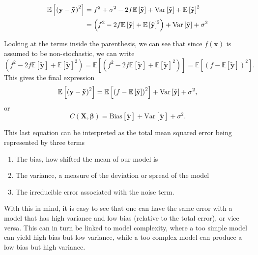 \documentclass[12pt]{article}
\begin{document}
\begin{align}
    \mathbb{E} \left[ \left( \mathbf{y} - \mathbf{\tilde{y}} \right)^2 \right] &= f^2 + \sigma^2 -2f\mathbb{E} \left[ \mathbf{\tilde{y}} \right] + \rm Var\left[\tilde{\mathbf{y}} \right] + \mathbb{E} \left[\tilde{\mathbf{y}}\right] ^2 \nonumber \\
    &= \left(f^2 -2f\mathbb{E} \left[ \mathbf{\tilde{y}} \right] + \mathbb{E} \left[\tilde{\mathbf{y}}\right] ^2 \right) + \rm Var\left[\tilde{\mathbf{y}} \right] + \sigma^2
\end{align}

Looking at the terms inside the parenthesis, we can see that since $f(\boldsymbol{x})$ is assumed to be non-stochastic, we can write 
\begin{equation}
    \left(f^2 -2f\mathbb{E} \left[ \mathbf{\tilde{y}} \right] + \mathbb{E} \left[\tilde{\mathbf{y}}\right] ^2 \right) = \mathbb{E} \left[\left(f^2 -2f\mathbb{E} \left[ \mathbf{\tilde{y}} \right] + \mathbb{E} \left[\tilde{\mathbf{y}}\right] ^2 \right) \right] = \mathbb{E} \left[\left(f - \mathbb{E} \left[\tilde{\mathbf{y}}\right] \right)^2 \right].
\end{equation}
This gives the final expression 
\begin{equation}\label{eq:bias-variance}
    \mathbb{E} \left[ \left( \mathbf{y} - \mathbf{\tilde{y}} \right)^2 \right] = \mathbb{E} \left[\left(f - \mathbb{E} \left[\tilde{\mathbf{y}}\right] \right)^2 \right] + \rm Var\left[\tilde{\mathbf{y}} \right] + \sigma^2,
\end{equation}
or
\begin{equation}
    C\left(\mathbf{X}, \boldsymbol{\beta}\right) = \text{Bias} \left[\mathbf{\tilde{y}}\right] + \text{Var} \left[\mathbf{\tilde{y}}\right] + \sigma^2.
\end{equation}

This last equation can be interpreted as the total mean squared error being represented by three terms
\begin{enumerate}
    \item The bias, how shifted the mean of our model is
    \item The variance, a measure of the deviation or spread of the model
    \item The irreducible error associated with the noise term.
\end{enumerate}

With this in mind, it is easy to see that one can have the same error with a model that has high variance and low bias (relative to the total error), or vice versa. This can in turn be linked to model complexity, where a too simple model can yield high bias but low variance, while a too complex model can produce a low bias but high variance. 
\end{document}
